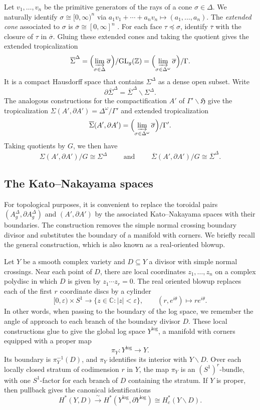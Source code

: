 \documentclass[12 pt]{amsart}
\newcommand{\fH}{\mathfrak H}
\newcommand{\CC}{\mathbb{C}}
\newcommand{\ZZ}{\mathbb{Z}}
\newcommand{\GL}{\mathrm{GL}}
\newcommand{\<}{\langle}
\renewcommand{\>}{\rangle}
\theoremstyle{definition}
\begin{document}
Let $v_1, \ldots, v_n$ be the primitive generators of the rays of a cone $\sigma \in \Delta$.  We naturally identify $\sigma \cong [0,\infty)^n $ via  $a_1 v_1 + \cdots + a_n v_n \mapsto (a_1, \ldots, a_n)$.  The \emph{extended cone} associated to $\sigma$ is $\overline \sigma \cong [0, \infty]^n$ \cite[\S2.3]{ACP}. For each face $\tau \preceq \sigma$, identify $\overline\tau$ with the closure of $\tau$ in $\overline\sigma$. Gluing these extended cones and taking the quotient gives the extended tropicalization
\[
\overline\Sigma^\Delta
= \Bigl(\varinjlim_{\sigma\in\Delta}\overline\sigma\Bigr)/\GL_g(\ZZ)
= \Bigl(\varinjlim_{\sigma\in\Delta^\omega}\overline\sigma\Bigr)/\Gamma.
\]
It is a compact Hausdorff space that contains $\Sigma^\Delta$ as a dense open subset. Write $$\partial\overline\Sigma^\Delta=\overline\Sigma^\Delta\smallsetminus\Sigma^\Delta.$$  The analogous constructions for the compactification $A'$ of $\Gamma' \backslash \fH$ give the tropicalization $\Sigma(A',\partial A') = \Delta^\omega/\Gamma'$ and extended tropicalization
\[
\overline\Sigma(A',\partial A') = \Bigl(\varinjlim_{\sigma\in\Delta^\omega}\overline\sigma\Bigr)/\Gamma'.
\]
Taking quotients by $G$, we then have
\[
\Sigma(A',\partial A')/G\cong\Sigma^\Delta
\qquad \mbox{ and } \qquad 
\overline\Sigma(A',\partial A')/G\cong\overline\Sigma^\Delta.
\]

\subsection{The Kato--Nakayama spaces}\label{sec:log-cover}

For topological purposes, it is convenient to replace the toroidal pairs $(A_g^\Delta,\partial A_g^\Delta)$ and $(A',\partial A')$ by the associated Kato--Nakayama spaces with their boundaries. The construction removes the simple normal crossing boundary divisor and substitutes the boundary of a manifold with corners. We briefly recall the general construction, which is also known as a real-oriented blowup.

\medskip

Let $Y$ be a smooth complex variety and $D\subseteq Y$ a divisor with simple normal crossings. Near each point of $D$, there are local coordinates $z_1,\ldots,z_n$ on a complex polydisc in which $D$ is given by $z_1\cdots z_r=0$. The real oriented blowup replaces each of the first $r$ coordinate discs by a cylinder
\[
[0,\varepsilon)\times S^1\longrightarrow\{z\in\CC:|z|<\varepsilon\},
\qquad
(r,e^{i\theta})\longmapsto r e^{i\theta}.
\]
In other words, when passing to the boundary of the log space, we remember the angle of approach to each branch of the boundary divisor $D$. These local constructions glue to give the global log space $Y^{\log}$, a manifold with corners equipped with a proper map \cite[\S1.2]{KatoNakayama}
\[
\pi_Y\colon Y^{\log}\longrightarrow Y.
\]
Its boundary is $\pi_Y^{-1}(D)$, and $\pi_Y$ identifies its interior with $Y\smallsetminus D$. Over each locally closed stratum of codimension $r$ in $Y$, the map $\pi_Y$ is an $(S^1)^r$-bundle, with one $S^1$-factor for each branch of $D$ containing the stratum. If $Y$ is proper, then pullback gives the canonical identifications
\[
H^*(Y,D)
\xrightarrow{\;\sim\;}
H^*(Y^{\log},\partial Y^{\log})
\cong H_c^*(Y\smallsetminus D).
\]
\end{document}
